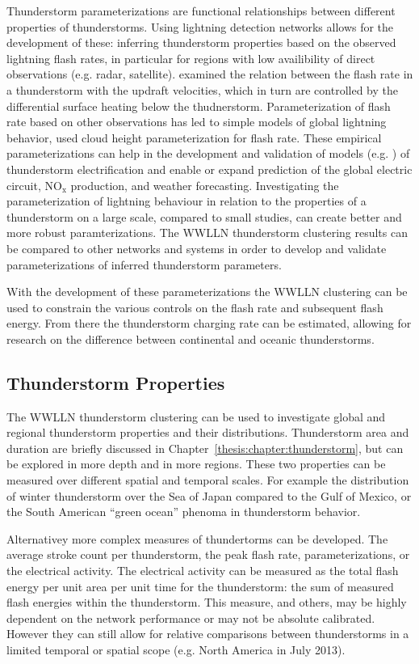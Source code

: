 Thunderstorm parameterizations are functional relationships between different properties of thunderstorms.
Using lightning detection networks allows for the development of these: inferring thunderstorm properties based on the observed lightning flash rates, in particular for regions with low availibility of direct observations (e.g. radar, satellite).
\citet{Zipser1994} examined the relation between the flash rate in a thunderstorm with the updraft velocities, which in turn are controlled by the differential surface heating below the thudnerstorm.
Parameterization of flash rate based on other observations has led to simple models of global lightning behavior, \citet{Price1992} used cloud height parameterization for flash rate.
These empirical parameterizations can help in the development and validation of models (e.g. \citet{Baker1999}) of thunderstorm electrification and enable or expand prediction of the global electric circuit, NO$_\text{x}$ production, and weather forecasting.
Investigating the parameterization of lightning behaviour in relation to the properties of a thunderstorm on a large scale, compared to small studies, can create better and more robust paramterizations.
The WWLLN thunderstorm clustering results can be compared to other networks and systems in order to develop and validate parameterizations of inferred thunderstorm parameters.

With the development of these parameterizations the WWLLN clustering can be used to constrain the various controls on the flash rate and subsequent flash energy.
From there the thunderstorm charging rate can be estimated, allowing for research on the difference between continental and oceanic thunderstorms.

\subsection{Thunderstorm Properties}

The WWLLN thunderstorm clustering can be used to investigate global and regional thunderstorm properties and their distributions.
Thunderstorm area and duration are briefly discussed in Chapter~\ref{thesis:chapter:thunderstorm}, but can be explored in more depth and in more regions.
These two properties can be measured over different spatial and temporal scales.
For example the distribution of winter thunderstorm over the Sea of Japan compared to the Gulf of Mexico, or the South American ``green ocean'' phenoma in thunderstorm behavior.

Alternativey more complex measures of thundertorms can be developed.
The average stroke count per thunderstorm, the peak flash rate, parameterizations, or the electrical activity.
The electrical activity can be measured as the total flash energy per unit area per unit time for the thunderstorm: the sum of measured flash energies within the thunderstorm.
This measure, and others, may be highly dependent on the network performance or may not be absolute calibrated.
However they can still allow for relative comparisons between thunderstorms in a limited temporal or spatial scope (e.g. North America in July 2013).

